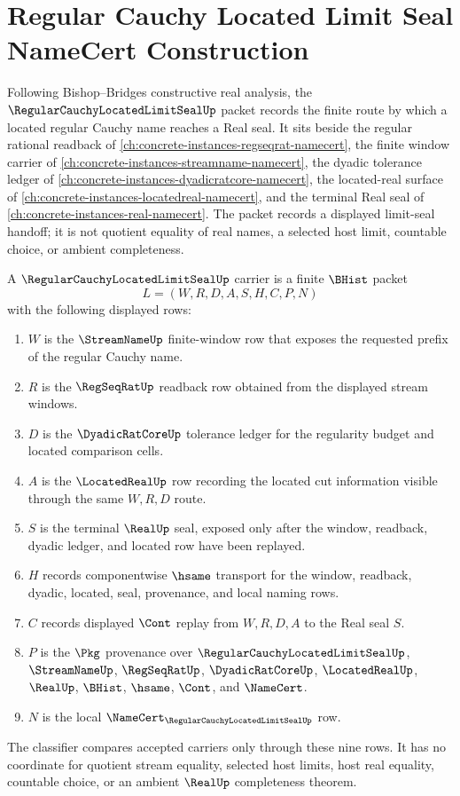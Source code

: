 \chapter{Regular Cauchy Located Limit Seal NameCert Construction}
\label{ch:concrete-instances-regular-cauchy-located-limit-seal-namecert}

Following Bishop--Bridges constructive real analysis, the $\RegularCauchyLocatedLimitSealUp$ packet records the finite route by which a located regular Cauchy name reaches a Real seal. It sits beside the regular rational readback of \autoref{ch:concrete-instances-regseqrat-namecert}, the finite window carrier of \autoref{ch:concrete-instances-streamname-namecert}, the dyadic tolerance ledger of \autoref{ch:concrete-instances-dyadicratcore-namecert}, the located-real surface of \autoref{ch:concrete-instances-locatedreal-namecert}, and the terminal Real seal of \autoref{ch:concrete-instances-real-namecert}. The packet records a displayed limit-seal handoff; it is not quotient equality of real names, a selected host limit, countable choice, or ambient completeness.

\begin{definition}
\label{def:regular-cauchy-located-limit-seal-carrier}
A $\RegularCauchyLocatedLimitSealUp$ carrier is a finite $\BHist$ packet
$$
L=(W,R,D,A,S,H,C,P,N)
$$
with the following displayed rows:
\begin{enumerate}
\item $W$ is the $\StreamNameUp$ finite-window row that exposes the requested prefix of the regular Cauchy name.
\item $R$ is the $\RegSeqRatUp$ readback row obtained from the displayed stream windows.
\item $D$ is the $\DyadicRatCoreUp$ tolerance ledger for the regularity budget and located comparison cells.
\item $A$ is the $\LocatedRealUp$ row recording the located cut information visible through the same $W,R,D$ route.
\item $S$ is the terminal $\RealUp$ seal, exposed only after the window, readback, dyadic ledger, and located row have been replayed.
\item $H$ records componentwise $\hsame$ transport for the window, readback, dyadic, located, seal, provenance, and local naming rows.
\item $C$ records displayed $\Cont$ replay from $W,R,D,A$ to the Real seal $S$.
\item $P$ is the $\Pkg$ provenance over $\RegularCauchyLocatedLimitSealUp$, $\StreamNameUp$, $\RegSeqRatUp$, $\DyadicRatCoreUp$, $\LocatedRealUp$, $\RealUp$, $\BHist$, $\hsame$, $\Cont$, and $\NameCert$.
\item $N$ is the local $\NameCert_{\RegularCauchyLocatedLimitSealUp}$ row.
\end{enumerate}
The classifier compares accepted carriers only through these nine rows. It has no coordinate for quotient stream equality, selected host limits, host real equality, countable choice, or an ambient $\RealUp$ completeness theorem.
\end{definition}

